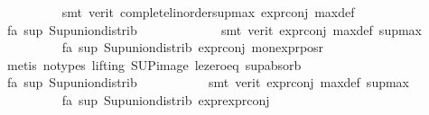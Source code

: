 \begin{isabellebody}
\ \ \ \ \ \ \ \ \isamarkupfalse%
\ {\isacharparenleft}{\kern0pt}smt\ {\isacharparenleft}{\kern0pt}verit{\isacharparenright}{\kern0pt}\ complete{\isacharunderscore}{\kern0pt}linorder{\isacharunderscore}{\kern0pt}sup{\isacharunderscore}{\kern0pt}max\ expr{\isacharunderscore}{\kern0pt}{}{\isacharunderscore}{\kern0pt}conj\ max{\isacharunderscore}{\kern0pt}def{\isacharparenright}{\kern0pt}\isanewline
\ \ \ \ \ \ \ \ \isamarkupfalse%
\ fa{\isacharunderscore}{\kern0pt}{\isasympsi}\ sup{\isacharunderscore}{\kern0pt}{\isasymphi}\ Sup{\isacharunderscore}{\kern0pt}union{\isacharunderscore}{\kern0pt}distrib\isanewline
\ \ \ \ \ \ \ \ \ \ \ \isamarkupfalse%
\ {\isacharparenleft}{\kern0pt}smt\ {\isacharparenleft}{\kern0pt}verit{\isacharparenright}{\kern0pt}\ expr{\isacharunderscore}{\kern0pt}{}{\isacharunderscore}{\kern0pt}conj\ max{\isacharunderscore}{\kern0pt}def\ sup{\isacharunderscore}{\kern0pt}max{\isacharparenright}{\kern0pt}\isanewline
\ \ \ \ \ \ \ \ \isamarkupfalse%
\ fa{\isacharunderscore}{\kern0pt}{\isasympsi}\ sup{\isacharunderscore}{\kern0pt}{\isasymphi}\ Sup{\isacharunderscore}{\kern0pt}union{\isacharunderscore}{\kern0pt}distrib\ expr{\isacharunderscore}{\kern0pt}{}{\isacharunderscore}{\kern0pt}conj\ mon{\isacharunderscore}{\kern0pt}expr{\isacharunderscore}{\kern0pt}{}{\isacharunderscore}{\kern0pt}pos{\isacharunderscore}{\kern0pt}r\isanewline
\ \ \ \ \ \ \ \ \ \ \isamarkupfalse%
\ {\isacharparenleft}{\kern0pt}metis\ {\isacharparenleft}{\kern0pt}no{\isacharunderscore}{\kern0pt}types{\isacharcomma}{\kern0pt}\ lifting{\isacharparenright}{\kern0pt}\ SUP{\isacharunderscore}{\kern0pt}image\ le{\isacharunderscore}{\kern0pt}zero{\isacharunderscore}{\kern0pt}eq\ sup{\isachardot}{\kern0pt}absorb{}{\isacharparenright}{\kern0pt}\isanewline
\ \ \ \ \ \ \ \ \isamarkupfalse%
\ fa{\isacharunderscore}{\kern0pt}{\isasympsi}\ sup{\isacharunderscore}{\kern0pt}{\isasymphi}\ Sup{\isacharunderscore}{\kern0pt}union{\isacharunderscore}{\kern0pt}distrib\isanewline
\ \ \ \ \ \ \ \ \ \isamarkupfalse%
\ {\isacharparenleft}{\kern0pt}smt\ {\isacharparenleft}{\kern0pt}verit{\isacharparenright}{\kern0pt}\ expr{\isacharunderscore}{\kern0pt}{}{\isacharunderscore}{\kern0pt}conj\ max{\isacharunderscore}{\kern0pt}def\ sup{\isacharunderscore}{\kern0pt}max{\isacharparenright}{\kern0pt}\isanewline
\ \ \ \ \ \ \ \ \isamarkupfalse%
\ fa{\isacharunderscore}{\kern0pt}{\isasympsi}\ sup{\isacharunderscore}{\kern0pt}{\isasymphi}\ Sup{\isacharunderscore}{\kern0pt}union{\isacharunderscore}{\kern0pt}distrib\ expr{\isacharunderscore}{\kern0pt}{}{\isachardot}{\kern0pt}expr{\isacharunderscore}{\kern0pt}{}{\isacharunderscore}{\kern0pt}conj\ \isanewline

\end{isabellebody}
